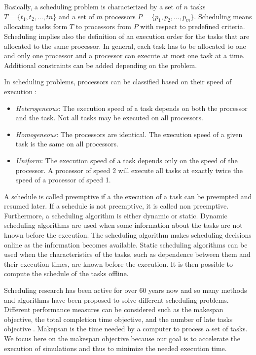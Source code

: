 Basically, a scheduling problem is characterized by a set of $n$ tasks $T = \{t_1, t_2, \ldots, tn\}$ and a set of $m$ processors $P = \{p_1, p_2, \ldots, p_m\}$. Scheduling means allocating tasks form $T$ to processors from $P$ with respect to predefined criteria. Scheduling implies also the definition of an execution order for the tasks that are allocated to the same processor. In general, each task has to be allocated to one and only one processor and a processor can execute at most one task at a time. Additional constraints can be added depending on the problem. 

In scheduling problems, processors can be classified based on their speed of execution \cite{davis:2011}:

\begin{itemize}
\item \textit{Heterogeneous}: The execution speed of a task depends on both the processor and the task. Not all tasks may be executed on all processors.
\item \textit{Homogeneous}: The processors are identical. The execution speed of a given task is the same on all processors.
\item \textit{Uniform}: The execution speed of a task depends only on the speed of the processor. A processor of speed 2 will execute all tasks at exactly twice the speed of a processor of speed 1.
\end{itemize}

A schedule is called preemptive if a the execution of a task can be preempted and resumed later. If a schedule is not preemptive, it is called non preemptive. Furthermore, a scheduling algorithm is either dynamic or static. Dynamic scheduling algorithms are used when some information about the tasks are not known before the execution. The scheduling algorithm makes scheduling decisions online as the information becomes available. Static scheduling algorithms can be used when the characteristics of the tasks, such as dependence between them and their execution times, are known before the execution. It is then possible to compute the schedule of the tasks offline.

Scheduling research has been active for over 60 years now and so many methods and algorithms have been proposed to solve different scheduling problems. Different performance measures can be considered such as the makespan objective, the total completion time objective, and the number of late tasks objective \cite{leung:2004}. Makepsan is the time needed by a computer to process a set of tasks. We focus here on the makespan objective because our goal is to accelerate the execution of simulations and thus to minimize the needed execution time.

